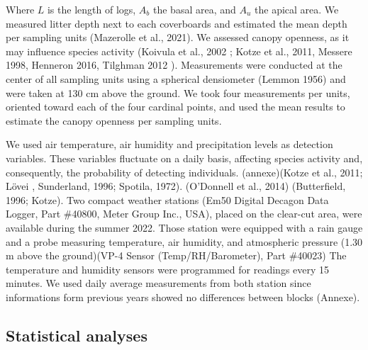 Where $L$ is the length of logs, $A_b$ the basal area, and $A_u$ the apical area.
We measured litter depth next to each coverboards and estimated the mean depth per sampling units (Mazerolle et al., 2021). 
We assessed canopy openness, as it may influence species activity (Koivula et al., 2002 ; Kotze et al., 2011, Messere 1998, Henneron 2016, Tilghman 2012 ).
Measurements were conducted at the center of all sampling units using a spherical densiometer (Lemmon 1956) and were taken at 130 cm above the ground. 
We took four measurements per units, oriented toward each of the four cardinal points, and used the mean results to estimate the canopy openness per sampling units.

We used air temperature, air humidity and precipitation levels as detection variables.
These variables fluctuate on a daily basis, affecting species activity and, consequently, the probability of detecting individuals. 
(annexe)(Kotze et al., 2011; Lövei , Sunderland, 1996; Spotila, 1972). (O’Donnell et al., 2014) (Butterfield, 1996; Kotze). %
Two compact weather stations (Em50 Digital Decagon Data Logger, Part \#40800, Meter Group Inc., USA), placed on the clear-cut area, were available during the summer 2022.
Those station were equipped with a rain gauge and a probe measuring temperature, air humidity, and atmospheric pressure (1.30 m above the ground)(VP-4 Sensor (Temp/RH/Barometer), Part \#40023)
The temperature and humidity sensors were programmed for readings every 15 minutes. 
We used daily average measurements from both station since informations form previous years showed no differences between blocks (Annexe).



\subsection*{Statistical analyses}
\label{subsec:analyses}

